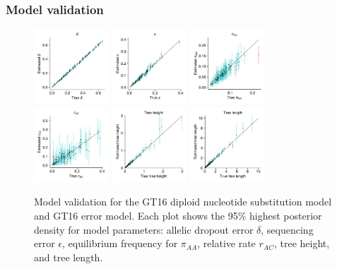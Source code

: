 \documentclass[10pt,letterpaper,table]{article}
\begin{document}
\subsubsection*{Model validation}
\begin{figure}[!h]
    \centering
    \includegraphics[width=0.25\textwidth]{figs_plos/gt16_EM_delta.pdf}
    \includegraphics[width=0.25\textwidth]{figs_plos/gt16_EM_epsilon.pdf}
    \includegraphics[width=0.25\textwidth]{figs_plos/gt16_EM_pi_0.pdf}
    \includegraphics[width=0.25\textwidth]{figs_plos/gt16_EM_rates_ac.pdf}
    \includegraphics[width=0.25\textwidth]{figs_plos/gt16_EM_treeheight.pdf}
    \includegraphics[width=0.25\textwidth]{figs_plos/gt16_EM_treelength.pdf}
    \caption{Model validation for the GT16 diploid nucleotide substitution model and GT16 error model. Each plot shows the 95\% highest posterior density for model parameters: allelic dropout error $\delta$, sequencing error $\epsilon$, equilibrium frequency for $\pi_{AA}$, relative rate $r_{AC}$, tree height, and tree length. }
    \label{fig_validation}
\end{figure}
\end{document}
